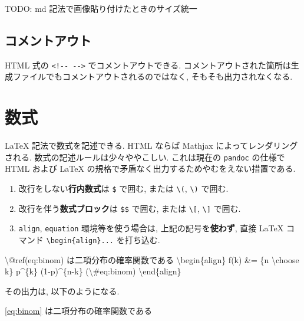 \documentclass[
  nomag]{bxjsbook}
\newenvironment{Shaded}{\begin{snugshade}}{\end{snugshade}}
\newcommand{\NormalTok}[1]{#1}
\newcommand{\SpecialCharTok}[1]{\textcolor[rgb]{0.00,0.00,0.00}{#1}}
\providecommand{\tightlist}{%
  \setlength{\itemsep}{0pt}\setlength{\parskip}{0pt}}
\theoremstyle{definition}
\theoremstyle{definition}
\theoremstyle{definition}
\theoremstyle{remark}
\begin{document}
TODO: md 記法で画像貼り付けたときのサイズ統一

\hypertarget{ux30b3ux30e1ux30f3ux30c8ux30a2ux30a6ux30c8}{%
\subsection{コメントアウト}\label{ux30b3ux30e1ux30f3ux30c8ux30a2ux30a6ux30c8}}

HTML 式の \texttt{\textless{}!-\/-\ -\/-\textgreater{}}
でコメントアウトできる.
コメントアウトされた箇所は生成ファイルでもコメントアウトされるのではなく,
そもそも出力されなくなる.

\hypertarget{ux6570ux5f0f}{%
\section{数式}\label{ux6570ux5f0f}}

LaTeX 記法で数式を記述できる. HTML ならば Mathjax
によってレンダリングされる. 数式の記述ルールは少々ややこしい.
これは現在の \texttt{pandoc} の仕様で HTML および LaTeX
の規格で矛盾なく出力するためやむをえない措置である.

\begin{enumerate}
\def\labelenumi{\arabic{enumi}.}
\tightlist
\item
  改行をしない\textbf{行内数式}は \texttt{\$} で囲む, または
  \texttt{\textbackslash{}(}, \texttt{\textbackslash{})} で囲む.
\item
  改行を伴う\textbf{数式ブロック}は \texttt{\$\$} で囲む, または
  \texttt{\textbackslash{}{[}}, \texttt{\textbackslash{}{]}} で囲む.
\item
  \texttt{align}, \texttt{equation} 環境等を使う場合は,
  上記の記号を\textbf{使わず}, 直接 LaTeX コマンド
  \texttt{\textbackslash{}begin\{align\}...} を打ち込む.
\end{enumerate}

\begin{Shaded}
\begin{Highlighting}[]
\NormalTok{\textbackslash{}@ref(eq:binom) は二項分布の確率関数である}
\NormalTok{\textbackslash{}begin\{align\}}
\NormalTok{f(k) \&= \{n \textbackslash{}choose k\} p\^{}\{k\} (1{-}p)\^{}\{n{-}k\} (}\SpecialCharTok{\textbackslash{}\#}\NormalTok{eq:binom)}
\NormalTok{\textbackslash{}end\{align\}}
\end{Highlighting}
\end{Shaded}

その出力は, 以下のようになる.

\eqref{eq:binom} は二項分布の確率関数である
\end{document}
